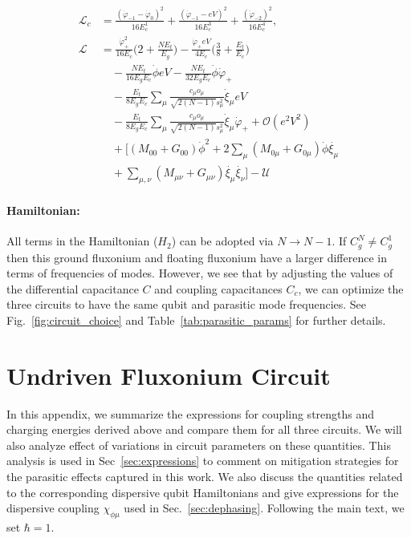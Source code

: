 \documentclass[%
reprint,
superscriptaddress,
 amsmath,amssymb,
 aps,
 prx,
longbibliography,
floatfix,
]{revtex4-2}
\newcommand{\ER}[1]{{\color{blue}{{}[ER: #1]}}}
\begin{document}
\begin{align}
    \mathcal{L}_{c}&=\frac{(\dot{\varphi}_{-1}-\dot{\varphi}_{0})^2}{16E^1_{c}}+\frac{(\dot{\varphi}_{-1}-eV)^2}{16E^3_{c}}+\frac{(\dot{\varphi}_{-2})^2}{16E^4_{c}},\\
 \mathcal{L}&=\frac{\dot{\varphi}_{+}^2}{16E_c}\Big(2+\frac{NE_t}{E_g}\Big)-\frac{\dot{\varphi}_{+}eV}{4E_c}\Big(\frac{3}{8}+\frac{E_t}{E_c}\Big)\nonumber\\
    &\quad-\frac{NE_t}{16E_gE_c}\dot{\phi}eV-\frac{NE_t}{32E_gE_c}\dot{\phi}\dot{\varphi}_{+}\\
    &\quad -\frac{E_t}{8E_gE_c} \sum_\mu\frac{c_\mu o_\mu}{\sqrt{2(N-1)}s_\mu^2}  \dot{\xi}_\mu eV\nonumber\\
    &\quad-\frac{E_t}{8E_gE_c} \sum_\mu\frac{c_\mu o_\mu}{\sqrt{2(N-1)}s_\mu^2}  \dot{\xi}_\mu\dot{\varphi}_{+}+\mathcal{O}(e^2V^2)\\
    &\quad+\Big[(M_{00}+G_{00})\dot{\phi}^2+2\sum_{\mu}(M_{0\mu}+G_{0\mu})\dot{\phi}\dot{\xi_\mu}\nonumber\\
    &\quad+\sum_{\mu,\nu}(M_{\mu\nu}+G_{\mu\nu})\dot{\xi_\mu}\dot{\xi_\nu}\Big]-\mathcal{U}
\end{align}

\paragraph{Hamiltonian:} All terms in the Hamiltonian ($H_2$) can be adopted \ER{what do you mean by adopted?} via $N\rightarrow N-1$. If $C_g^N\neq C_g^1$ then this ground fluxonium and floating fluxonium have a larger difference in terms of frequencies of modes. However, we see that by adjusting the values of the differential capacitance $C$ and coupling capacitances $C_c$, we can optimize the three circuits to have the same qubit and parasitic mode frequencies. See Fig.~\ref{fig:circuit_choice} and Table~\ref{tab:parasitic_params} for further details.


\section{Undriven Fluxonium Circuit}\label{app:Hamiltonian}
In this appendix, we summarize the expressions for coupling strengths and charging energies derived above and compare them for all three circuits. We will also analyze effect of variations in circuit parameters on these quantities. This analysis is used in Sec~\ref{sec:expressions} to comment on mitigation strategies for the parasitic effects captured in this work. We also discuss the quantities related to the corresponding dispersive qubit Hamiltonians and give expressions for the dispersive coupling $\chi_{\phi\mu}$ used in Sec.~\ref{sec:dephasing}. Following the main text, we set $\hbar=1$. 
\end{document}
